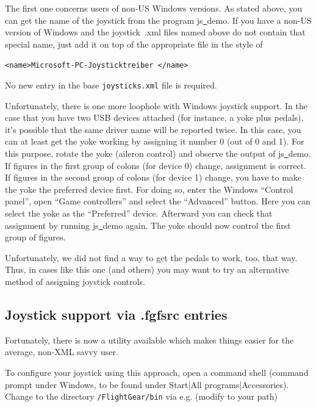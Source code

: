 The first one concerns users of non-US Windows versions. As stated above, you can get the name of the joystick from the program js\underline{~}demo. If you have a non-US version of Windows and the joystick~.xml files named above do not contain that special name, just add it on top of the appropriate file in the style of
\medskip

 \texttt{<name>Microsoft-PC-Joysticktreiber </name>}
 \medskip

\noindent
No new entry in the base \texttt{joysticks.xml} file is required.

Unfortunately, there is one more loophole with Windows joystick support. In the case that you have two USB devices attached (for instance, a yoke plus pedals), it's possible that the same driver name will be reported twice. In this
case, you can at least get the yoke working by assigning it number 0 (out of
0 and 1). For this purpose, rotate the yoke (aileron control) and observe
the output of js\underline{~}demo. If figures in the first group of colons
(for device 0) change, assignment is correct. If figures in the second group
of colons (for device 1) change, you have to make the yoke the preferred
device first. For doing so, enter the
Windows ``Control panel'', open ``Game controllers'' and select the
``Advanced'' button. Here you can select the yoke as the ``Preferred''
device. Afterward you can check that assignment by running
js\underline{~}demo again. The yoke should now control the first group of
figures.

Unfortunately, we did not find a way to get the pedals to work, too, that way. Thus, in cases like this one (and others) you may want to try an alternative method of assigning joystick controls.


\subsection{Joystick support via .fgfsrc entries\label{fgfsrcjoy}}
Fortunately, there is now a utility available which makes things easier for the average, non-XML savvy user.

To configure your joystick using this approach, open a command shell (command prompt under Windows, to be found under Start|All programs|Accessories). Change to the directory \texttt{/FlightGear/bin} via e.g. (modify to your path)


